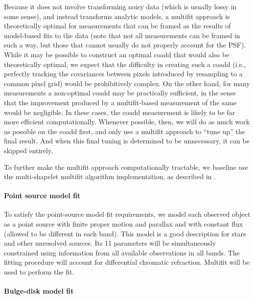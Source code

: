 \documentclass[12pt]{article}
\begin{document}
Because it does not involve transforming noisy data (which is usually
lossy in some sense), and instead transforms analytic models, a
multifit approach is theoretically optimal for measurements that can
be framed as the results of model-based fits to the data (note that
not all measurements can be framed in such a way, but those that
cannot usually do not properly account for the PSF). %
While it may be
possible to construct an optimal coadd that would also be
theoretically optimal, we expect that the difficulty in creating such
a coadd (i.e., perfectly tracking the covariances between pixels
introduced by resampling to a common pixel grid) would be prohibitively
complex.  On the other hand, for many measurements a non-optimal coadd
may be practically
sufficient, in the sense that the improvement produced by a
multifit-based measurement of the same would be negligible.  In these
cases, the coadd measurement is likely to be far more efficient
computationally.  Whenever possible, then, we will do as much work as
possible on the coadd first, and only use a multifit approach to ``tune up''
the final result.  And when this final tuning is determined to be
unnecessary, it can be skipped entirely.

To further make the multifit approach computationally tractable, we baseline use the multi-shapelet multifit algorithm implementation, as described in \cite{Bosch13}.

\paragraph{Point source model fit} To satisfy the point-source model fit requirements, we model each observed object as a point source with finite proper motion and parallax and with constant flux (allowed to be different in each band). This model is a good description for stars and other unresolved sources. Its 11 parameters will be simultaneously constrained using information from all available observations in all bands. The fitting procedure will account for differential chromatic refraction. Multifit will be used to perform the fit.

\paragraph{Bulge-disk model fit}
\end{document}
